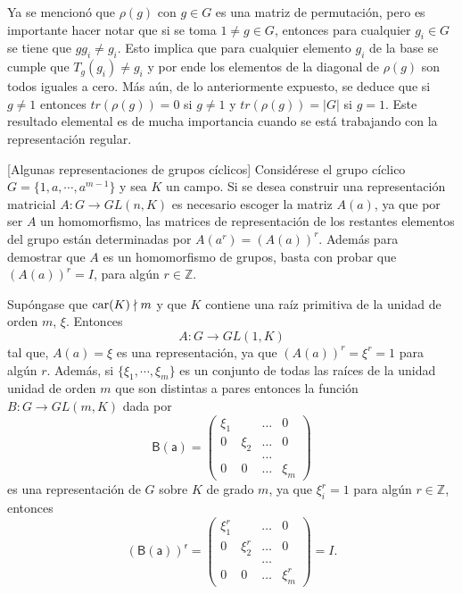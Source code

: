 \begin{nota}
Ya se mencionó que $\rho(g)$ con $g \in G$ es una matriz de permutación, pero es importante hacer notar que si se toma $ 1 \neq g \in G$, entonces para cualquier $g_i \in G$ se tiene que $ gg_i \neq g_i $. Esto implica que para cualquier elemento $g_i$ de la base se cumple que $T_g(g_i) \neq g_i$ y por ende los elementos de la diagonal de $\rho(g)$ son todos iguales a cero. Más aún, de lo anteriormente expuesto, se deduce que si $g \neq 1$ entonces $tr(\rho(g)) = 0$ si $g \neq 1$ y $tr(\rho(g)) = |G|$ si $g = 1$. Este resultado elemental es de mucha importancia cuando se está trabajando con la representación regular.
\end{nota}
\begin{ejemplo}\label{rciclica}[Algunas representaciones de grupos cíclicos]
Considérese el grupo cíclico $G = \{1,a, \cdots, a^{m-1} \}$ y sea $K$ un campo. Si se desea construir una representación matricial $A \colon G \to GL(n,K)$ es necesario escoger la matriz $A(a)$, ya que por ser $A$ un homomorfismo, las matrices de representación de los restantes elementos del grupo están determinadas por $A(a^r) = (A(a))^r $. Además para demostrar que $A$ es un homomorfismo de grupos, basta con probar que $(A(a))^r = I$, para algún $r \in \mathds{Z}$.

Supóngase que $\operatorname{car}(K) \nmid m$ y que $K$ contiene una raíz primitiva de la unidad de orden $m$,  $\xi$. Entonces 
\begin{equation*} A \colon G \to GL(1,K) \end{equation*}  tal que, $A(a)  = \xi$ es una representación, ya que $(A(a))^r = \xi^r = 1$ para algún $r$.  Además, si $\{ \xi_1, \cdots, \xi_m \}$ es un conjunto de todas las raíces de la unidad unidad de orden $m$ que son distintas a pares entonces la función $B \colon G \to GL(m,K)$ dada por 
\begin{equation*} \mathsf{B(a)} = \begin{pmatrix}
\xi_1 &  &\dots &  0 \\
0 & \xi_2 & \dots & 0 \\
 & & \dots &  \\
 0 & 0 & \dots & \xi_m
\end{pmatrix} \end{equation*} es una representación de $G$ sobre $K$ de grado $m$, ya que $\xi_i^r = 1$ para algún $r \in \mathds{Z}$, entonces 
\begin{equation*} \mathsf{(B(a))^r} = \begin{pmatrix}
\xi_1^r &  &\dots &  0 \\
0 & \xi_2^r & \dots & 0 \\
 & & \dots &  \\
 0 & 0 & \dots & \xi_m^r
\end{pmatrix} = I. \end{equation*}


\end{ejemplo}
